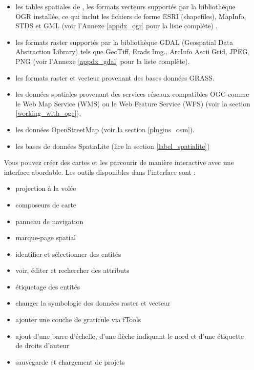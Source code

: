 \begin{itemize}[label=--]
\item les tables spatiales de \ppg, les formats vecteurs supportés par la bibliothèque OGR installée, ce qui inclut les fichiers de forme ESRI (shapefiles), MapInfo, STDS et GML (voir l'Annexe \ref{appdx_ogr} pour la liste complète) .
\item les formats raster supportés par la bibliothèque GDAL (Geospatial Data Abstraction Library) tels que GeoTiff, Erads Img., ArcInfo Ascii Grid, JPEG, PNG (voir l'Annexe \ref{appdx_gdal} pour la liste complète).

\item les formats raster et vecteur provenant des bases données GRASS. 
\item les données spatiales provenant des services réseaux compatibles OGC comme le Web Map Service (WMS) ou le Web Feature Service (WFS) (voir la  section \ref{working_with_ogc}),
\item les données OpenStreetMap (voir la section \ref{plugins_osm}).

\item les bases de données SpatiaLite (lire la section \ref{label_spatialite}) 
\end{itemize}

Vous pouvez créer des cartes et les parcourir de manière interactive avec une interface abordable. Les outils disponibles dans l'interface sont :

\begin{itemize}[label=--]
\item projection à la volée
\item composeurs de carte
\item panneau de navigation
\item marque-page spatial
\item identifier et sélectionner des entités
\item voir, éditer et rechercher des attributs
\item étiquetage des entités
\item changer la symbologie des données raster et vecteur
\item ajouter une couche de graticule via fTools
\item ajout d'une barre d'échelle, d'une flèche indiquant le nord et d'une étiquette de droits d'auteur
\item sauvegarde et chargement de projets
\end{itemize}

